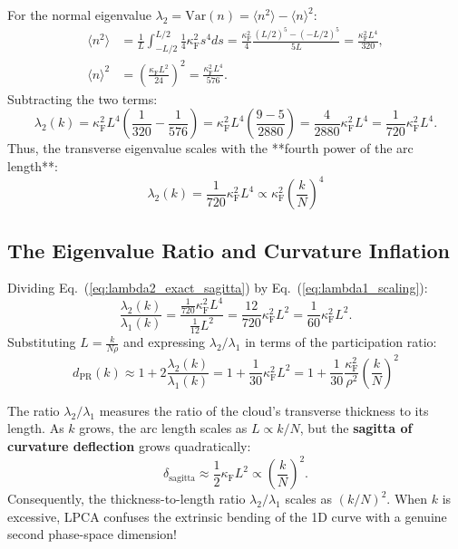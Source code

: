 \documentclass[11pt,a4paper]{article}
\begin{document}
For the normal eigenvalue $\lambda_2 = \mathrm{Var}(n) = \langle n^2 \rangle - \langle n \rangle^2$:
\begin{align}
    \langle n^2 \rangle &= \frac{1}{L}\int_{-L/2}^{L/2} \frac{1}{4}\kappa_{\mathrm{F}}^2 s^4 ds = \frac{\kappa_{\mathrm{F}}^2}{4} \frac{(L/2)^5 - (-L/2)^5}{5L} = \frac{\kappa_{\mathrm{F}}^2 L^4}{320}, \\
    \langle n \rangle^2 &= \left(\frac{\kappa_{\mathrm{F}} L^2}{24}\right)^2 = \frac{\kappa_{\mathrm{F}}^2 L^4}{576}.
\end{align}
Subtracting the two terms:
\begin{equation}
    \lambda_2(k) = \kappa_{\mathrm{F}}^2 L^4 \left(\frac{1}{320} - \frac{1}{576}\right) = \kappa_{\mathrm{F}}^2 L^4 \left(\frac{9 - 5}{2880}\right) = \frac{4}{2880} \kappa_{\mathrm{F}}^2 L^4 = \frac{1}{720} \kappa_{\mathrm{F}}^2 L^4.
    \label{eq:lambda2_exact_sagitta}
\end{equation}
Thus, the transverse eigenvalue scales with the **fourth power of the arc length**:
\begin{equation}
    \boxed{\lambda_2(k) = \frac{1}{720} \kappa_{\mathrm{F}}^2 L^4 \propto \kappa_{\mathrm{F}}^2 \left(\frac{k}{N}\right)^4}
\end{equation}

\subsection{The Eigenvalue Ratio and Curvature Inflation}
Dividing Eq.~(\ref{eq:lambda2_exact_sagitta}) by Eq.~(\ref{eq:lambda1_scaling}):
\begin{equation}
    \frac{\lambda_2(k)}{\lambda_1(k)} = \frac{\frac{1}{720} \kappa_{\mathrm{F}}^2 L^4}{\frac{1}{12} L^2} = \frac{12}{720} \kappa_{\mathrm{F}}^2 L^2 = \frac{1}{60} \kappa_{\mathrm{F}}^2 L^2.
    \label{eq:ratio_exact}
\end{equation}
Substituting $L = \frac{k}{N\rho}$ and expressing $\lambda_2/\lambda_1$ in terms of the participation ratio:
\begin{equation}
    d_{\mathrm{PR}}(k) \approx 1 + 2\frac{\lambda_2(k)}{\lambda_1(k)} = 1 + \frac{1}{30} \kappa_{\mathrm{F}}^2 L^2 = \boxed{1 + \frac{1}{30}\frac{\kappa_{\mathrm{F}}^2}{\rho^2} \left(\frac{k}{N}\right)^2}
    \label{eq:pr_curvature_scaling}
\end{equation}

\begin{tcolorbox}[colback=yellow!5!white,colframe=orange!75!black,title=\textbf{Geometric Theorem: The Sagitta Artifact}]
The ratio $\lambda_2 / \lambda_1$ measures the ratio of the cloud's transverse thickness to its length. As $k$ grows, the arc length scales as $L \propto k/N$, but the \textbf{sagitta of curvature deflection} grows quadratically:
\begin{equation}
    \delta_{\mathrm{sagitta}} \approx \frac{1}{2} \kappa_{\mathrm{F}} L^2 \propto \left(\frac{k}{N}\right)^2.
\end{equation}
Consequently, the thickness-to-length ratio $\lambda_2/\lambda_1$ scales as $(k/N)^2$. When $k$ is excessive, LPCA confuses the extrinsic bending of the 1D curve with a genuine second phase-space dimension!
\end{tcolorbox}
\end{document}
